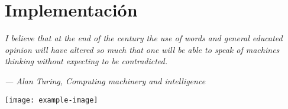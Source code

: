 \chapter{Implementación} 
\epigraph{\textit{I believe that at the end of the century the use of words and general educated opinion will have altered so much that one will be able to speak of machines thinking without expecting to be contradicted.     
	}}{\textit{—  Alan Turing, Computing machinery and intelligence}}
	\vspace*{8cm}
	\begin{center}
		\centering
		\texttt{[image: example-image]}
	\end{center}
	\thispagestyle{empty}
	\newpage
\vspace*{2cm}

